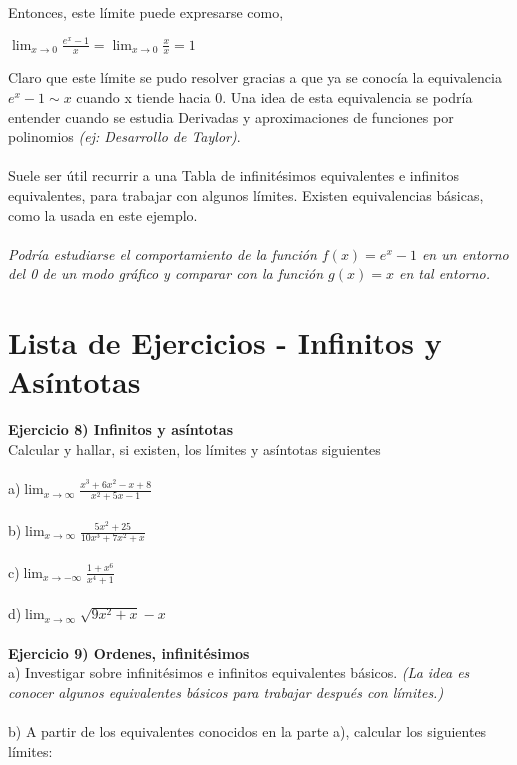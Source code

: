 \documentclass[11pt, a4paper]{article}
\begin{document}
{Entonces, este l\'imite puede expresarse como, \\
\begin{center}
    {\color{blue}$ \displaystyle \lim_{ x \to 0 } \frac{e^{x} - 1}{x} =  \lim_{ x \to 0 } \frac{x}{x} = 1$ }  \\ \hfill

    
\end{center}
Claro que este l\'imite se pudo resolver gracias a que ya se conoc\'ia la equivalencia $ e^{x} - 1 \sim x $ cuando x tiende hacia 0. Una idea de esta equivalencia se podr\'ia entender cuando se estudia Derivadas y aproximaciones de funciones por polinomios \textit{(ej: Desarrollo de Taylor)}. \\ \\ 
Suele ser \'util recurrir a una Tabla de infinit\'esimos equivalentes e infinitos equivalentes, para trabajar con algunos l\'imites. Existen equivalencias b\'asicas, como la  usada en este ejemplo. \\ \\ 
\textit{{\color{magenta} Podr\'ia estudiarse el comportamiento de la funci\'on $f(x) = e^{x} - 1$ en un entorno del 0 de un modo gr\'afico y comparar con la funci\'on $g(x) = x $ en tal entorno. }}


\newpage
\section{Lista de Ejercicios - Infinitos y 
As\'intotas}
\textbf{Ejercicio 8) Infinitos y as\'intotas } \\
Calcular y hallar, si existen, los l\'imites y as\'intotas siguientes \\ \\ 
a)$ \displaystyle \lim_{x \to \infty} \frac{x^3 + 6x^2-x+8}{x^2+5x-1}  $ \\ \\ 
b)$ \displaystyle \lim_{x \to \infty} \frac{5x^2 + 25}{10x^3+7x^2+x}$ \\ \\
c)$ \displaystyle \lim_{x \to -\infty} \frac{1 + x^6}{ x^4 + 1} $ \\ \\ 
d)$ \displaystyle \lim_{x \to \infty} \sqrt{9x^2+x} -x $ \\ \\
\textbf{Ejercicio 9) Ordenes, infinit\'esimos }\\ 
a) Investigar sobre infinit\'esimos e infinitos equivalentes b\'asicos. \textit{(La idea es conocer algunos equivalentes b\'asicos para trabajar despu\'es con l\'imites.)} \\ \\ 
b) A partir de los equivalentes conocidos en la parte a), calcular los siguientes l\'imites: \\

}
\end{document}

